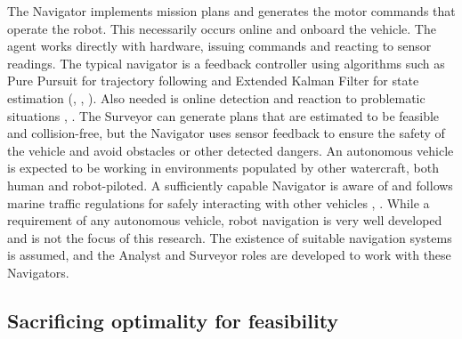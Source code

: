 \documentclass{tamuccthesis}
\begin{document}
The Navigator implements mission plans and generates the motor commands that operate the robot. This necessarily occurs online and onboard the vehicle. The agent works directly with hardware, issuing commands and reacting to sensor readings. The typical navigator is a feedback controller using algorithms such as Pure Pursuit for trajectory following and Extended Kalman Filter for state estimation (\cite{purepursuit_kalman:2009}, \cite{kalman:naeem:2009}, \cite{gnss:gao:2016}). Also needed is online detection and reaction to problematic situations \cite{linearprog:len:2013}, . The Surveyor can generate plans that are estimated to be feasible and collision-free, but the Navigator uses sensor feedback to ensure the safety of the vehicle and avoid obstacles or other detected dangers. An autonomous vehicle is expected to be working in environments populated by other watercraft, both human and robot-piloted. A sufficiently capable Navigator is aware of and follows marine traffic regulations for safely interacting with other vehicles \cite{naeem2012colregs}, \cite{wang:2018}. While a requirement of any autonomous vehicle, robot navigation is very well developed and is not the focus of this research. The existence of suitable navigation systems is assumed, and the Analyst and Surveyor roles are developed to work with these Navigators. 

\subsection{Sacrificing optimality for feasibility}
\end{document}
